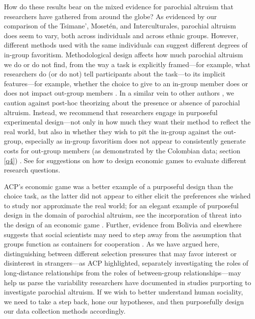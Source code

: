 \documentclass[bibauthoryear]{aa}
\begin{document}
	How do these results bear on the mixed evidence for parochial altruism that researchers have gathered from around the globe? As evidenced by our comparison of the Tsimane', Moset\'en, and Interculturales, parochial altruism does seem to vary, both across individuals and across ethnic groups. However, different methods used with the same individuals can suggest different degrees of in-group favoritism. Methodological design affects how much parochial altruism we do or do not find, from the way a task is explicitly framed---for example, what researchers do (or do not) tell participants about the task---to its implicit features---for example, whether the choice to give to an in-group member does or does not impact out-group members \citep{hagen2006game, lightner2017, Pisor2020}. In a similar vein to other authors \citep[e.g.,][]{hagen2006game, guala2012reciprocity}, we caution against post-hoc theorizing about the presence or absence of parochial altruism. Instead, we recommend that researchers engage in purposeful experimental design---not only in how much they want their method to reflect the real world, but also in whether they wish to pit the in-group against the out-group, especially as in-group favoritism does not appear to consistently generate costs for out-group members (as demonstrated by the Colombian data; section \ref{q4}) \citep{brewer2006evolutionary, cashdan2001ethnocentrism, hruschka2013economic, purzycki2019identity, schaub2017threat, yamagishi2013behavioral}. See \citet{Pisor2020} for suggestions on how to design economic games to evaluate different research questions.
	
	ACP's economic game was a better example of a purposeful design than the choice task, as the latter did not appear to either elicit the preferences she wished to study nor approximate the real world; for an elegant example of purposeful design in the domain of parochial altruism, see the incorporation of threat into the design of an economic game \citep{schaub2017threat}. Further, evidence from Bolivia and elsewhere suggests that social scientists may need to step away from the assumption that groups function as containers for cooperation \citep{moya2015different}. As we have argued here, distinguishing between different selection pressures that may favor interest or disinterest in strangers---as ACP highlighted, separately investigating the roles of long-distance relationships from the roles of between-group relationships---may help us parse the variability researchers have documented in studies purporting to investigate parochial altruism. If we wish to better understand human sociality, we need to take a step back, hone our hypotheses, and then purposefully design our data collection methods accordingly.
\end{document}
